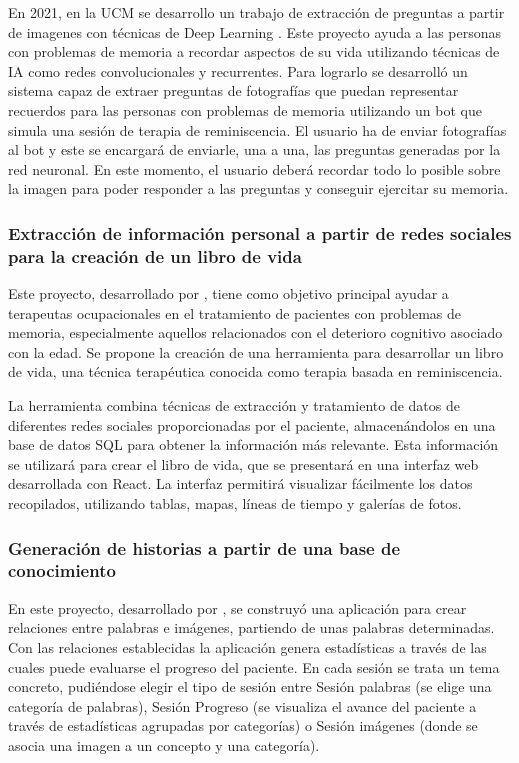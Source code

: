 En 2021, en la UCM se desarrollo un trabajo de extracción de preguntas a partir de imagenes con técnicas de Deep Learning \citep{boto2021extraccion}. Este proyecto ayuda a las personas con problemas de memoria a recordar aspectos de su vida utilizando técnicas de IA como redes convolucionales y recurrentes. Para lograrlo se desarrolló un sistema capaz de extraer preguntas de fotografías que puedan representar recuerdos para las personas con problemas de memoria utilizando un bot que simula una sesión de terapia de reminiscencia.
El usuario ha de enviar fotografías al bot y este se encargará de enviarle, una a una, las preguntas generadas por la red neuronal. En este momento, el usuario deberá recordar todo lo posible sobre la imagen para poder responder a las preguntas y conseguir ejercitar su memoria.

\subsubsection{Extracción de información personal a partir de redes sociales para la creación de un libro de vida}
Este proyecto, desarrollado por \cite{aguilera2021extraccion}, tiene como objetivo principal ayudar a terapeutas ocupacionales en el tratamiento de pacientes con problemas de memoria, especialmente aquellos relacionados con el deterioro cognitivo asociado con la edad. Se propone la creación de una herramienta para desarrollar un libro de vida, una técnica terapéutica conocida como terapia basada en reminiscencia. 

La herramienta combina técnicas de extracción y tratamiento de datos de diferentes redes sociales proporcionadas por el paciente, almacenándolos en una base de datos SQL para obtener la información más relevante. Esta información se utilizará para crear el libro de vida, que se presentará en una interfaz web desarrollada con React. La interfaz permitirá visualizar fácilmente los datos recopilados, utilizando tablas, mapas, líneas de tiempo y galerías de fotos.

\subsubsection{Generación de historias a partir de una base de conocimiento}
En este proyecto, desarrollado por \cite{lucia_latorre_magaz}, se construyó una aplicación para crear relaciones entre palabras e imágenes,
partiendo de unas palabras determinadas. Con las relaciones establecidas la aplicación genera estadísticas a través de las cuales puede evaluarse el progreso del paciente. En cada sesión se trata un tema concreto, pudiéndose elegir el tipo de sesión entre Sesión palabras (se elige una categoría de palabras), Sesión Progreso (se visualiza el avance del paciente a través de estadísticas agrupadas por categorías) o Sesión imágenes (donde se asocia una imagen a un concepto y una categoría).
